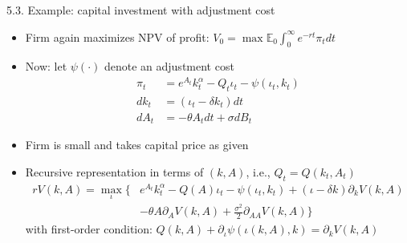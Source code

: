 \documentclass[10pt]{beamer}
\begin{document}
\begin{frame}{5.3. Example: capital investment with adjustment cost}
\begin{itemize}
\item Firm again maximizes NPV of profit: $V_0 = \max \mathbb{E}_0 \int_0^\infty e^{- r t} \pi_t dt$

\item Now: let $\psi(\cdot)$ denote an adjustment cost
\begin{align*}
	\pi_t &= e^{A_t} k_t^\alpha - Q_t \iota_t - \psi(\iota_t, k_t) \\
	d k_t &= (\iota_t - \delta k_t) dt \\
	d A_t &= - \theta A_t dt + \sigma dB_t
\end{align*}

\item Firm is small and takes capital price as given 

\item Recursive representation in terms of $(k, A)$, i.e., $Q_t = Q(k_t, A_t)$
\begin{align*}
	r V(k, A) = \max_\iota \Big\{ &e^{A_t} k_t^\alpha - Q(A) \iota_t - \psi(\iota_t, k_t) + (\iota - \delta k) \partial_k V(k, A) \\
	& - \theta A \partial_A V(k, A) + \frac{\sigma^2}{2} \partial_{AA} V(k, A) \Big\}
\end{align*}
with first-order condition: $Q(k, A) + \partial_\iota \psi(\iota(k, A), k) = \partial_k V(k, A)$
\end{itemize}
\end{frame}
\end{document}
